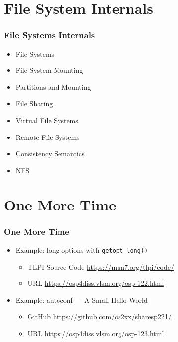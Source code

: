 \documentclass[aspectratio=169, xcolor=table, notheorems, hyperref={pdfpagelabels=false}]{beamer}
\begin{document}
\section{File System Internals}
\begin{frame}[fragile]
\frametitle{File Systems Internals}
\begin{itemize}
\item File Systems
\item File-System Mounting
\item Partitions and Mounting
\item File Sharing
\item Virtual File Systems
\item Remote File Systems
\item Consistency Semantics
\item NFS
\end{itemize}
\end{frame}

\section{One More Time}
\begin{frame}[fragile]
\frametitle{One More Time}
\begin{itemize}
\item Example: long options with \texttt{getopt\_long()}
\begin{itemize}
\item TLPI Source Code \url{https://man7.org/tlpi/code/}
\item URL \url{https://osp4diss.vlsm.org/osp-122.html}
\end{itemize}
\item Example: autoconf --- A Small Hello World
\begin{itemize}
\item GitHub \url{https://github.com/os2xx/sharesp221/}
\item URL \url{https://osp4diss.vlsm.org/osp-123.html}
\end{itemize}
\end{itemize}
\end{frame}

\end{document}

